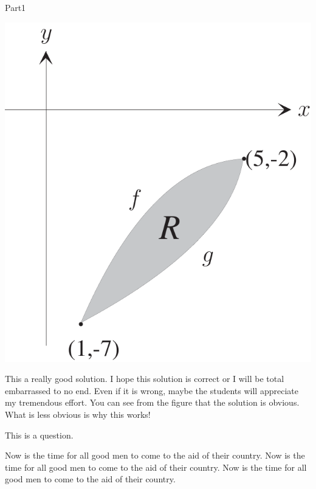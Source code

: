 \documentclass[12pt]{article}
\begin{document}
\begin{exam}[Part I.]{Part1}
\begin{problem*}[10ea]
\begin{parts}
\begin{splitsolution}
\begin{panel}[r]
\includegraphics[scale=.2]{fig1}
\end{panel}
\begin{solution}
This a really good  solution. I hope this solution is correct or I will be total
embarrassed to no end. Even if it is wrong, maybe the students will appreciate
my tremendous effort. You can see from the figure that the solution is obvious.
What is less obvious is why this works!
\end{solution}
\end{splitsolution}

\item This is a question.
\begin{solution}[.75in]
Now is the time for all good men to come to the aid of their country.
Now is the time for all good men to come to the aid of their country.
Now is the time for all good men to come to the aid of their country.
\end{solution}
\end{parts}
\end{problem*}



\end{exam}
\end{document}
